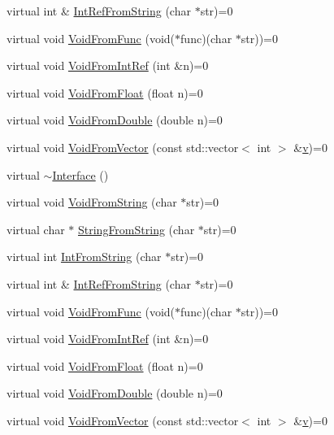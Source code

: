 \begin{DoxyCompactItemize}
\item 
virtual int \& \mbox{\hyperlink{class_interface_ab93276de67e60c44fd775d4c139aa8e1}{Int\+Ref\+From\+String}} (char $\ast$str)=0
\item 
virtual void \mbox{\hyperlink{class_interface_a7dab3c82b857a9a5f52b3ce6f7df547f}{Void\+From\+Func}} (void($\ast$func)(char $\ast$str))=0
\item 
virtual void \mbox{\hyperlink{class_interface_aa43fb56650a57b6b3e7743e54e50cb86}{Void\+From\+Int\+Ref}} (int \&n)=0
\item 
virtual void \mbox{\hyperlink{class_interface_ae2b3e9411c893a45642d3af632752c66}{Void\+From\+Float}} (float n)=0
\item 
virtual void \mbox{\hyperlink{class_interface_aa56524017aabdbe46510648c711ab8a8}{Void\+From\+Double}} (double n)=0
\item 
virtual void \mbox{\hyperlink{class_interface_ae84fe7e53f881db2f823ad35d004927a}{Void\+From\+Vector}} (const std\+::vector$<$ int $>$ \&\mbox{\hyperlink{_important_values_8h_aaad811047eb9ea3edb6ec2bbeddb2b2b}{v}})=0
\item 
virtual \mbox{\hyperlink{class_interface_a67eca71a4ef8d28dc959dd495e2b2b59}{$\sim$\+Interface}} ()
\item 
virtual void \mbox{\hyperlink{class_interface_a65d6ae604e7e9a513aec72c9c94e0b97}{Void\+From\+String}} (char $\ast$str)=0
\item 
virtual char $\ast$ \mbox{\hyperlink{class_interface_a756b1d22c12aa3f14a5083f90043fbf0}{String\+From\+String}} (char $\ast$str)=0
\item 
virtual int \mbox{\hyperlink{class_interface_ab34c8a5fd2236a6b009f86a4e5851b61}{Int\+From\+String}} (char $\ast$str)=0
\item 
virtual int \& \mbox{\hyperlink{class_interface_ab93276de67e60c44fd775d4c139aa8e1}{Int\+Ref\+From\+String}} (char $\ast$str)=0
\item 
virtual void \mbox{\hyperlink{class_interface_a7dab3c82b857a9a5f52b3ce6f7df547f}{Void\+From\+Func}} (void($\ast$func)(char $\ast$str))=0
\item 
virtual void \mbox{\hyperlink{class_interface_aa43fb56650a57b6b3e7743e54e50cb86}{Void\+From\+Int\+Ref}} (int \&n)=0
\item 
virtual void \mbox{\hyperlink{class_interface_ae2b3e9411c893a45642d3af632752c66}{Void\+From\+Float}} (float n)=0
\item 
virtual void \mbox{\hyperlink{class_interface_aa56524017aabdbe46510648c711ab8a8}{Void\+From\+Double}} (double n)=0
\item 
virtual void \mbox{\hyperlink{class_interface_ae84fe7e53f881db2f823ad35d004927a}{Void\+From\+Vector}} (const std\+::vector$<$ int $>$ \&\mbox{\hyperlink{_important_values_8h_aaad811047eb9ea3edb6ec2bbeddb2b2b}{v}})=0
\end{DoxyCompactItemize}


